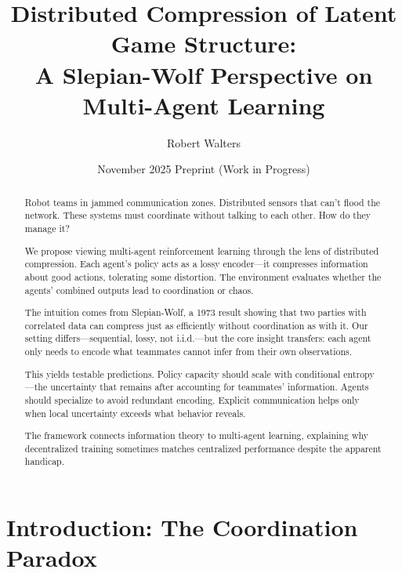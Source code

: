 \documentclass[10pt, letterpaper]{article}
\title{Distributed Compression of Latent Game Structure:\\ A Slepian-Wolf Perspective on Multi-Agent Learning}
\author{Robert Walters}
\date{November 2025 \quad\textbar\quad Preprint (Work in Progress)}
\begin{document}
\maketitle

\begin{center}
\end{center}

\begin{abstract}
Robot teams in jammed communication zones. Distributed sensors that can't flood the network. These systems must coordinate without talking to each other. How do they manage it?

We propose viewing multi-agent reinforcement learning through the lens of distributed compression. Each agent's policy acts as a lossy encoder---it compresses information about good actions, tolerating some distortion. The environment evaluates whether the agents' combined outputs lead to coordination or chaos.

The intuition comes from Slepian-Wolf, a 1973 result showing that two parties with correlated data can compress just as efficiently without coordination as with it. Our setting differs---sequential, lossy, not i.i.d.---but the core insight transfers: each agent only needs to encode what teammates cannot infer from their own observations.

This yields testable predictions. Policy capacity should scale with conditional entropy---the uncertainty that remains after accounting for teammates' information. Agents should specialize to avoid redundant encoding. Explicit communication helps only when local uncertainty exceeds what behavior reveals.

The framework connects information theory to multi-agent learning, explaining why decentralized training sometimes matches centralized performance despite the apparent handicap.
\end{abstract}

\section{Introduction: The Coordination Paradox}
\label{sec:introduction}
\end{document}
